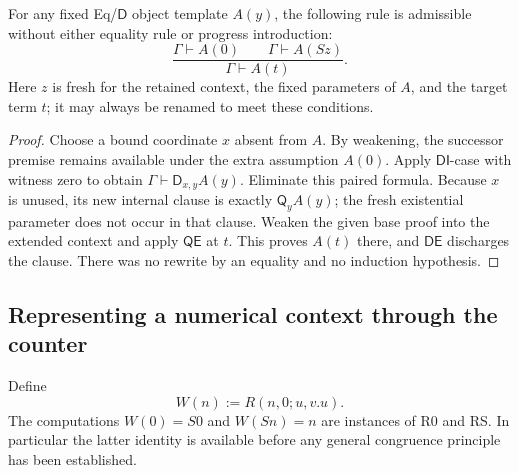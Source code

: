 \begin{lemma}
\label{ctr:cases}
For any fixed Eq/$\mathsf D$ object template $A(y)$, the following rule
is admissible without either equality rule or progress introduction:
\[
 \frac{\Gamma\vdash A(0)\qquad\Gamma\vdash A(Sz)}
      {\Gamma\vdash A(t)}.
 \tag{Cases}
\]
Here $z$ is fresh for the retained context, the fixed parameters of
$A$, and the target term $t$; it may always be renamed to meet these
conditions.
\end{lemma}
\begin{proof}
Choose a bound coordinate $x$ absent from $A$. By weakening, the
successor premise remains available under the extra assumption
$A(0)$. Apply $\mathsf{DI}$-case with witness zero to obtain
$\Gamma\vdash\mathsf D_{x,y}A(y)$. Eliminate this paired formula.
Because $x$ is unused, its new internal clause is exactly
$\mathsf Q_yA(y)$; the fresh existential parameter does not occur in
that clause. Weaken the given base proof into the extended context and
apply $\mathsf{QE}$ at $t$. This proves $A(t)$ there, and
$\mathsf{DE}$ discharges the clause. There was no rewrite by an
equality and no induction hypothesis.
\end{proof}

\subsection{Representing a numerical context through the counter}

Define
\[
                  W(n):=R(n,0;u,v.u).
\]
The computations $W(0)=S0$ and $W(Sn)=n$ are instances of R0 and RS.
In particular the latter identity is available before any general
congruence principle has been established.

